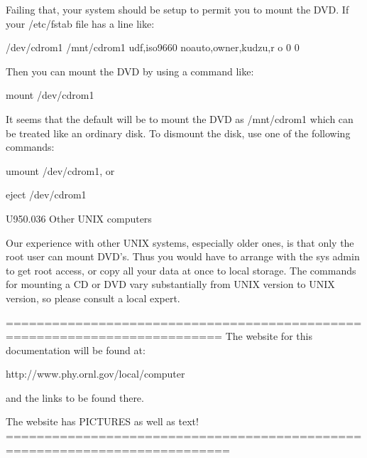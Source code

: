    Failing  that,  your system should be setup to permit you to mount the DVD.
   If your /etc/fstab file has a line like:
 
   /dev/cdrom1     /mnt/cdrom1      udf,iso9660 noauto,owner,kudzu,r o 0 0
 
   Then you can mount the DVD by using a command like:
 
   mount /dev/cdrom1
 
   It seems that the default will be to mount the DVD  as   /mnt/cdrom1  which
   can  be treated like an ordinary disk. To dismount the disk, use one of the
   following commands:
 
   umount /dev/cdrom1, or
 
   eject /dev/cdrom1
 
 
   U950.036  Other UNIX computers
 
   Our experience with other UNIX systems,  especially  older  ones,  is  that
   only  the  root  user  can mount DVD's. Thus you would have to arrange with
   the sys admin to get root access, or copy all your data at  once  to  local
   storage. The commands for mounting a CD or DVD vary substantially from UNIX
   version to UNIX version, so please consult a local expert.
 
   ==========================================================================
   The website for this documentation will be found at:
 
   http://www.phy.ornl.gov/local/computer
 
   and the links to be found there.
 
   The website has PICTURES as well as text!
   ===========================================================================

